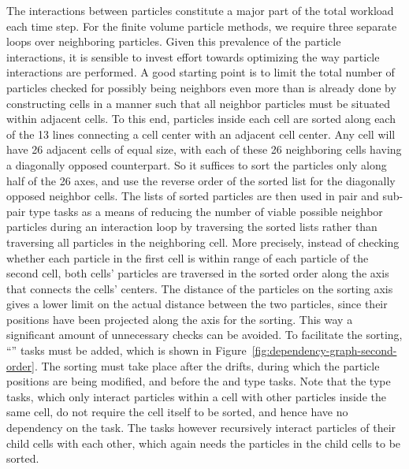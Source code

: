 The interactions between particles constitute a major part of the total workload each time step. For
the finite volume particle methods, we require three separate loops over neighboring particles.
Given this prevalence of the particle interactions, it is sensible to invest effort towards
optimizing the way particle interactions are performed. A good starting point is to limit the total
number of particles checked for possibly being neighbors even more than is already done by
constructing cells in a manner such that all neighbor particles must be situated within adjacent
cells. To this end, particles inside each cell are sorted along each of the 13 lines connecting a
cell center with an adjacent cell center. Any cell will have 26 adjacent cells of equal size, with
each of these 26 neighboring cells having a diagonally opposed counterpart. So it suffices to sort
the particles only along half of the 26 axes, and use the reverse order of the sorted list for the
diagonally opposed neighbor cells. The lists of sorted particles are then used in pair and sub-pair
type tasks as a means of reducing the number of viable possible neighbor particles during an
interaction loop by traversing the sorted lists rather than traversing all particles in the
neighboring cell. More precisely, instead of checking whether each particle in the first cell is
within range of each particle of the second cell, both cells' particles are traversed in the sorted
order along the axis that connects the cells' centers. The distance of the particles on the sorting
axis gives a lower limit on the actual distance between the two particles, since their positions
have been projected along the axis for the sorting. This way a significant amount of unnecessary
checks can be avoided. To facilitate the sorting, ``'' tasks must be added, which is
shown in Figure~\ref{fig:dependency-graph-second-order}. The sorting must take place after the
drifts, during which the particle positions are being modified, and before the  and
 type tasks. Note that the  type tasks, which only interact particles
within a cell with other particles inside the same cell, do not require the cell itself to be
sorted, and hence have no dependency on the  task. The  tasks however
recursively interact particles of their child cells with each other, which again needs the particles
in the child cells to be sorted.


